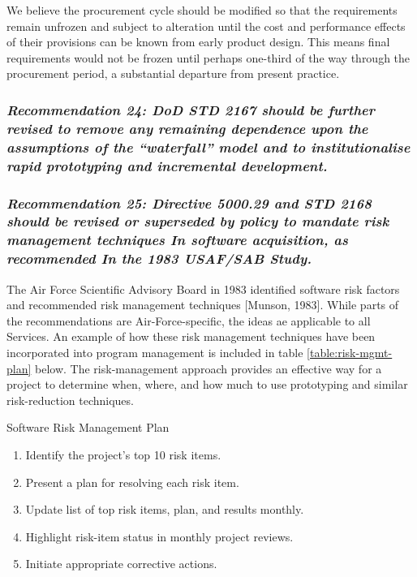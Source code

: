 \documentclass[12pt]{article}
\begin{document}
We believe the procurement cycle should be modified so that the requirements
remain unfrozen and subject to alteration until the cost and performance
effects of their provisions can be known from early product design. This means
final requirements would not be frozen until perhaps one-third of the way
through the procurement period, a substantial departure from present practice.

\subsubsection*{\textit{Recommendation 24: DoD STD 2167 should be further revised to remove
any remaining dependence upon the assumptions of the “waterfall” model and
to institutionalise rapid prototyping and incremental development.}}

\subsubsection*{\textit{Recommendation 25: Directive 5000.29 and STD 2168 should be revised
or superseded by policy to mandate risk management techniques In software
acquisition, as recommended In the 1983 USAF/SAB Study.}}

The Air Force Scientific Advisory Board in 1983 identified software risk
factors and recommended risk management techniques [Munson, 1983]. While parts
of the recommendations are Air-Force-specific, the ideas ae applicable to all
Services. An example of how these risk management techniques have been
incorporated into program management is included in table
\ref{table:risk-mgmt-plan} below. The risk-management approach provides an
effective way for a project to determine when, where, and how much to use
prototyping and similar risk-reduction techniques.

\addtocounter{section}{-1}

\begin{table}[hb]
    \caption{Software Risk Management Plan}
    \label{table:risk-mgmt-plan}
\begin{enumerate}
    \item Identify the project's top 10 risk items.
    \item Present a plan for resolving each risk item.
    \item Update list of top risk items, plan, and results monthly.
    \item Highlight risk-item status in monthly project reviews.
    \item Initiate appropriate corrective actions.
\end{enumerate}
\end{table}
\end{document}
